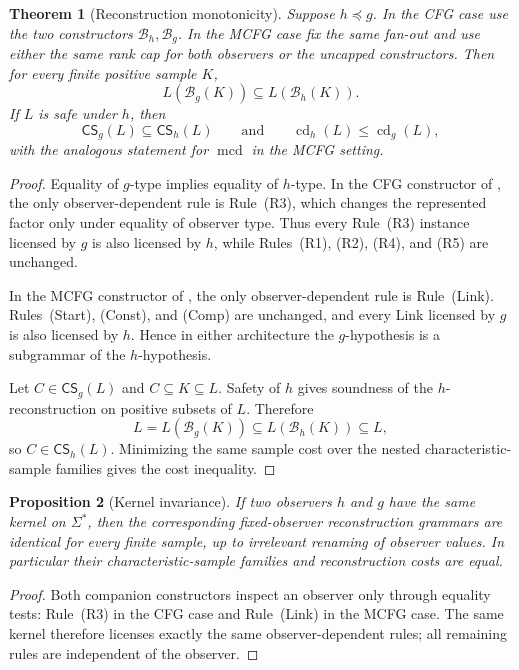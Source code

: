 \documentclass[11pt]{article}
\newtheorem{theorem}{Theorem}[section]
\newtheorem{proposition}[theorem]{Proposition}
\theoremstyle{definition}
\theoremstyle{remark}
\newcommand{\cd}{\operatorname{cd}}
\newcommand{\mcd}{\operatorname{mcd}}
\newcommand{\CS}{\mathsf{CS}}
\begin{document}
\begin{theorem}[Reconstruction monotonicity]
\label{thm:monotonicity}
Suppose \(h\preceq g\).  In the CFG case use the two constructors
\(\mathcal B_h,\mathcal B_g\).  In the MCFG case fix the same fan-out and use
either the same rank cap for both observers or the uncapped constructors.
Then for every finite positive sample \(K\),
\[
 L(\mathcal B_g(K))\subseteq L(\mathcal B_h(K)).
\]
If \(L\) is safe under \(h\), then
\[
 \CS_g(L)\subseteq\CS_h(L)
 \qquad\text{and}\qquad
 \cd_h(L)\le\cd_g(L),
\]
with the analogous statement for \(\mcd\) in the MCFG setting.
\end{theorem}

\begin{proof}
Equality of \(g\)-type implies equality of \(h\)-type.  In the CFG constructor
of \cite{KuriyamaCFG}, the only observer-dependent rule is Rule~(R3), which
changes the represented factor only under equality of observer type.  Thus
every Rule~(R3) instance licensed by \(g\) is also licensed by \(h\), while
Rules~(R1), (R2), (R4), and (R5) are unchanged.

In the MCFG constructor of \cite{KuriyamaMCFG}, the only observer-dependent
rule is Rule~(Link).  Rules~(Start), (Const), and (Comp) are unchanged, and
every Link licensed by \(g\) is also licensed by \(h\).  Hence in either
architecture the \(g\)-hypothesis is a subgrammar of the \(h\)-hypothesis.

Let \(C\in\CS_g(L)\) and \(C\subseteq K\subseteq L\).  Safety of \(h\)
gives soundness of the \(h\)-reconstruction on positive subsets of \(L\).
Therefore
\[
 L=L(\mathcal B_g(K))
 \subseteq L(\mathcal B_h(K))
 \subseteq L,
\]
so \(C\in\CS_h(L)\).  Minimizing the same sample cost over the nested
characteristic-sample families gives the cost inequality.
\end{proof}

\begin{proposition}[Kernel invariance]
\label{prop:kernel-invariance}
If two observers \(h\) and \(g\) have the same kernel on \(\Sigma^*\), then
the corresponding fixed-observer reconstruction grammars are identical for
every finite sample, up to irrelevant renaming of observer values.  In
particular their characteristic-sample families and reconstruction costs are
equal.
\end{proposition}

\begin{proof}
Both companion constructors inspect an observer only through equality tests:
Rule~(R3) in the CFG case and Rule~(Link) in the MCFG case.  The same kernel
therefore licenses exactly the same observer-dependent rules; all remaining
rules are independent of the observer.
\end{proof}
\end{document}
